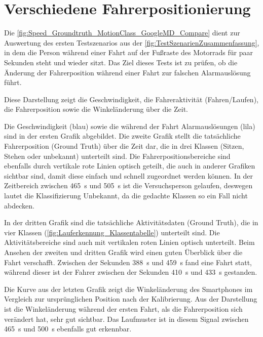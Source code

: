 \section{Verschiedene Fahrerpositionierung}
Die \autoref{fig:Speed_Groundtruth_MotionClass_GoogleMD_Compare} dient zur Auswertung des ersten Testszenarios aus der \autoref{fig:TestSzenarienZusammenfassung}, in dem die Person während einer Fahrt auf der Fußraste des Motorrads für paar Sekunden steht und wieder sitzt. Das Ziel dieses Tests ist zu prüfen, ob die Änderung der Fahrerposition während einer Fahrt zur falschen Alarmauslösung führt.

Diese Darstellung zeigt die Geschwindigkeit, die Fahreraktivität (Fahren/Laufen), die Fahrerposition sowie die Winkeländerung über die Zeit.

Die Geschwindigkeit (blau) sowie die während der Fahrt Alarmauslösungen (lila) sind in der ersten Grafik abgebildet.
Die zweite Grafik stellt die tatsächliche Fahrerposition (Ground Truth) über die Zeit dar, die in drei Klassen (Sitzen, Stehen oder unbekannt) unterteilt sind.
Die Fahrerpositionsbereiche sind ebenfalls durch vertikale rote Linien optisch geteilt, die auch in anderer Grafiken sichtbar sind, damit diese einfach und schnell zugeordnet werden können.
In der Zeitbereich zwischen \SI{465}{\second} und \SI{505}{\second} ist die Versuchsperson gelaufen, deswegen lautet die Klassifizierung \glqq Unbekannt\grqq{}, da die gedachte Klassen so ein Fall nicht abdecken.

In der dritten Grafik sind die tatsächliche Aktivitätsdaten (Ground Truth), die in vier Klassen (\autoref{fig:Lauferkennung_Klassentabelle}) unterteilt sind. Die Aktivitätsbereiche sind auch mit vertikalen roten Linien optisch unterteilt. Beim Ansehen der zweiten und dritten Grafik wird einen guten Überblick über die Fahrt verschafft. Zwischen der Sekunden \SI{388}{\second} und \SI{459}{\second} fand eine Fahrt statt, während dieser ist der Fahrer zwischen der Sekunden \SI{410}{\second} und \SI{433}{\second} gestanden.

Die Kurve aus der letzten Grafik zeigt die Winkeländerung des Smartphones im Vergleich zur ursprünglichen Position nach der Kalibrierung. Aus der Darstellung ist die Winkeländerung während der ersten Fahrt, als die Fahrerposition sich verändert hat, sehr gut sichtbar. Das Laufmuster ist in diesem Signal zwischen \SI{465}{\second} und \SI{500}{\second} ebenfalls gut erkennbar.

